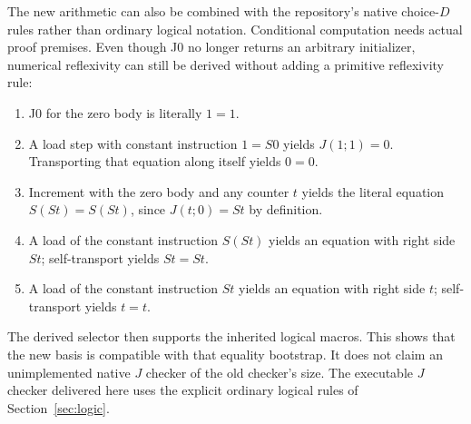 \documentclass[11pt,letterpaper]{article}
\theoremstyle{definition}\newtheorem{definition}[theorem]{Definition}
\theoremstyle{remark}\newtheorem{remark}[theorem]{Remark}
\begin{document}
The new arithmetic can also be combined with the repository's native
choice-$D$ rules rather than ordinary logical notation. Conditional
computation needs actual proof premises. Even though J0 no longer
returns an arbitrary initializer, numerical reflexivity can still be
derived without adding a primitive reflexivity rule:
\begin{enumerate}
\item J0 for the zero body is literally $1=1$.
\item A load step with constant instruction $1=S0$ yields
$J(1;1)=0$. Transporting that equation along itself yields $0=0$.
\item Increment with the zero body and any counter $t$ yields the
literal equation $S(St)=S(St)$, since $J(t;0)=St$ by definition.
\item A load of the constant instruction $S(St)$ yields an equation
with right side $St$; self-transport yields $St=St$.
\item A load of the constant instruction $St$ yields an equation
with right side $t$; self-transport yields $t=t$.
\end{enumerate}
The derived selector then supports the inherited logical macros.
This shows that the new basis is compatible with that equality
bootstrap. It does not claim an unimplemented native $J$ checker
of the old checker's size. The executable $J$ checker delivered here
uses the explicit ordinary logical rules of Section~\ref{sec:logic}.
\end{document}
